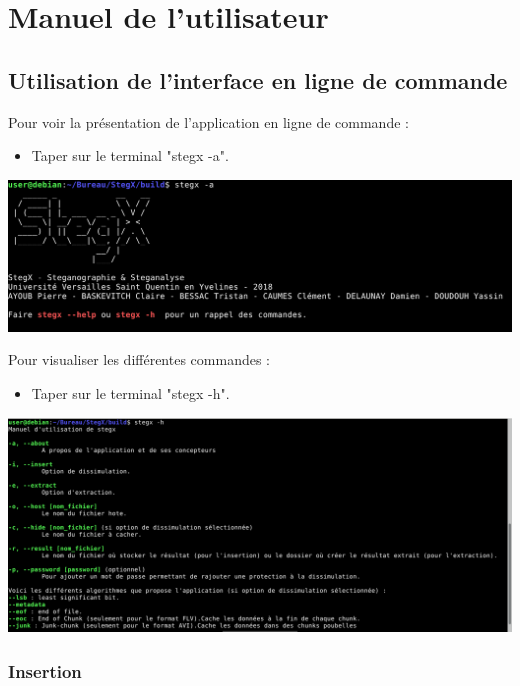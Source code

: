 \documentclass[11pt]{article}
\begin{document}
\section{Manuel de l'utilisateur}

\subsection{Utilisation de l'interface en ligne de commande}

Pour voir la présentation de l'application en ligne de commande :
\begin{itemize}
\item Taper sur le terminal "stegx -a".
\end{itemize}

\vspace{0.5cm}
\hspace{0.5cm}
\includegraphics[scale=0.6]{pictures/present.png}
\vspace{1cm}

Pour visualiser les différentes commandes : 
\begin{itemize}
\item Taper sur le terminal "stegx -h".
\end{itemize}

\vspace{0.5cm}
\hspace{-0.5cm}
\includegraphics[scale=0.5]{pictures/help.png}

\subsubsection{Insertion}
\end{document}
